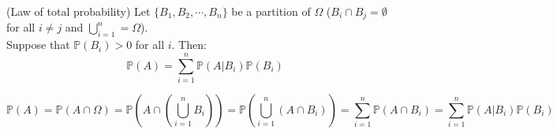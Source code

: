 \documentclass{huhtakm-template-book}
\newcommand{\prob}{\mathbb{P}}
\begin{document}
    \begin{lem}(Law of total probability)
        Let $\{B_{1},B_{2},\cdots,B_{n}\}$ be a partition of $\Omega$ ($B_{i}\cap B_{j}=\emptyset$ for all $i\neq j$ and $\bigcup_{i=1}^{n}=\Omega$).\\
        Suppose that $\prob(B_{i})>0$ for all $i$. Then:
        \begin{equation*}
            \prob(A)=\sum_{i=1}^{n}\prob(A|B_{i})\prob(B_{i})
        \end{equation*}
    \end{lem}
    \begin{proofing}
        \begin{equation*}
            \prob(A)=\prob(A\cap\Omega)=\prob\left(A\cap\left(\bigcup_{i=1}^{n}B_{i}\right)\right)=\prob\left(\bigcup_{i=1}^{n}(A\cap B_{i})\right)=\sum_{i=1}^{n}\prob(A\cap B_{i})=\sum_{i=1}^{n}\prob(A|B_{i})\prob(B_{i})
        \end{equation*}
    \end{proofing}
    \newpage
\end{document}
